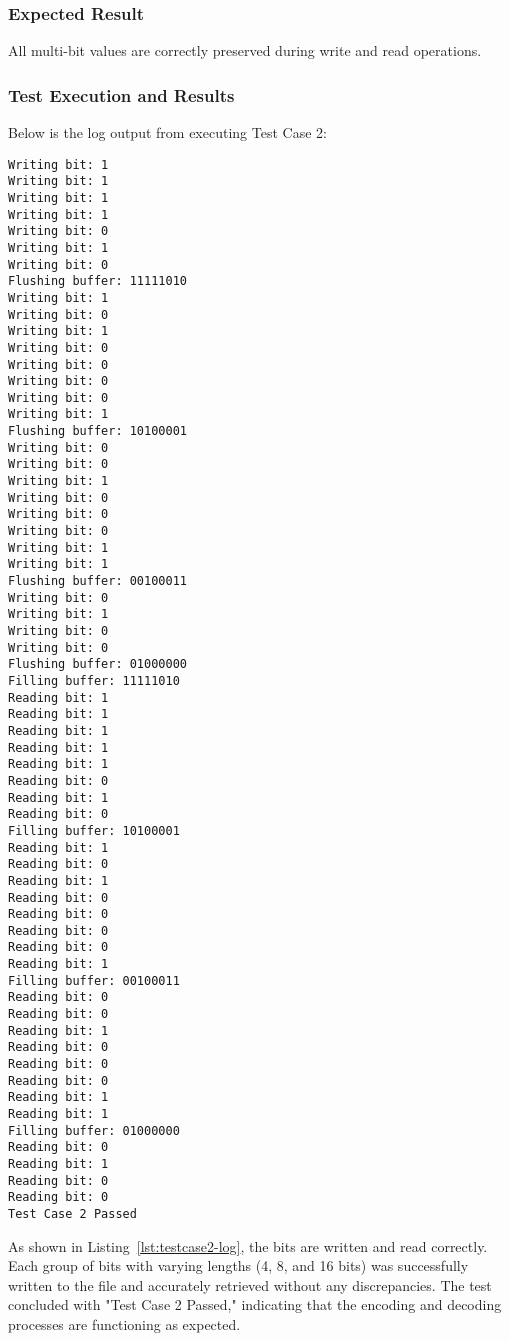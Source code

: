 \documentclass[11pt,twoside,a4paper]{report}
\begin{document}
\subsubsection{Expected Result}
All multi-bit values are correctly preserved during write and read operations.

\subsubsection{Test Execution and Results}
Below is the log output from executing Test Case 2:

\begin{lstlisting}[style=logstyle, caption={Test Case 2 Execution Log}, label={lst:testcase2-log}]
Writing bit: 1
Writing bit: 1
Writing bit: 1
Writing bit: 1
Writing bit: 0
Writing bit: 1
Writing bit: 0
Flushing buffer: 11111010
Writing bit: 1
Writing bit: 0
Writing bit: 1
Writing bit: 0
Writing bit: 0
Writing bit: 0
Writing bit: 0
Writing bit: 1
Flushing buffer: 10100001
Writing bit: 0
Writing bit: 0
Writing bit: 1
Writing bit: 0
Writing bit: 0
Writing bit: 0
Writing bit: 1
Writing bit: 1
Flushing buffer: 00100011
Writing bit: 0
Writing bit: 1
Writing bit: 0
Writing bit: 0
Flushing buffer: 01000000
Filling buffer: 11111010
Reading bit: 1
Reading bit: 1
Reading bit: 1
Reading bit: 1
Reading bit: 1
Reading bit: 0
Reading bit: 1
Reading bit: 0
Filling buffer: 10100001
Reading bit: 1
Reading bit: 0
Reading bit: 1
Reading bit: 0
Reading bit: 0
Reading bit: 0
Reading bit: 0
Reading bit: 1
Filling buffer: 00100011
Reading bit: 0
Reading bit: 0
Reading bit: 1
Reading bit: 0
Reading bit: 0
Reading bit: 0
Reading bit: 1
Reading bit: 1
Filling buffer: 01000000
Reading bit: 0
Reading bit: 1
Reading bit: 0
Reading bit: 0
Test Case 2 Passed
\end{lstlisting}

As shown in Listing~\ref{lst:testcase2-log}, the bits are written and read correctly. Each group of bits with varying lengths (4, 8, and 16 bits) was successfully written to the file and accurately retrieved without any discrepancies. The test concluded with "Test Case 2 Passed," indicating that the encoding and decoding processes are functioning as expected.
\end{document}
